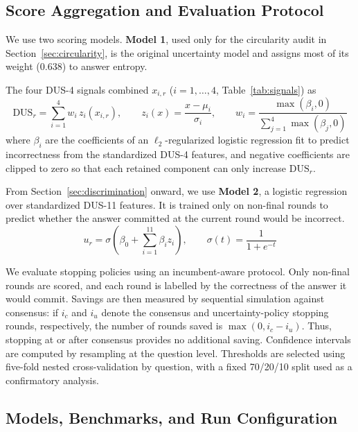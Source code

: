 \documentclass{llncs}
\begin{document}
\subsection{Score Aggregation and Evaluation Protocol}
\label{sec:protocols}

We use two scoring models. \textbf{Model 1}, used only for the circularity audit in Section~\ref{sec:circularity}, is the original uncertainty model and assigns most of its weight (0.638) to answer entropy. 

The four DUS-4 signals combined $x_{i,r}$ ($i=1,\dots,4$, Table~\ref{tab:signals}) as
\begin{equation}
\mathrm{DUS}_r = \sum_{i=1}^{4} w_i\, z_i(x_{i,r}), \qquad
z_i(x) = \frac{x-\mu_i}{\sigma_i}, \qquad
w_i = \frac{\max(\beta_i,0)}{\sum_{j=1}^{4}\max(\beta_j,0)}
\label{eq:dus4}
\end{equation}
where $\beta_i$ are the coefficients of an $\ell_2$-regularized logistic regression fit to predict incorrectness from the standardized DUS-4 features, and negative coefficients are clipped to zero so that each retained component can only increase $\mathrm{DUS}_r$.

From Section~\ref{sec:discrimination} onward, we use \textbf{Model 2}, a logistic regression over standardized DUS-11 features. It is trained only on non-final rounds to predict whether the answer committed at the current round would be incorrect.
\begin{equation}
u_r = \sigma\!\left(\beta_0+\sum_{i=1}^{11}\beta_i z_i\right),
\qquad \sigma(t)=\frac{1}{1+e^{-t}}
\label{eq:dus11}
\end{equation}

We evaluate stopping policies using an incumbent-aware protocol. Only non-final rounds are scored, and each round is labelled by the correctness of the answer it would commit. Savings are then measured by sequential simulation against consensus: if $i_c$ and $i_u$ denote the consensus and uncertainty-policy stopping rounds, respectively, the number of rounds saved is $\max(0,i_c-i_u)$. Thus, stopping at or after consensus provides no additional saving. Confidence intervals are computed by resampling at the question level. Thresholds are selected using five-fold nested cross-validation by question, with a fixed 70/20/10 split used as a confirmatory analysis.

\subsection{Models, Benchmarks, and Run Configuration}
\end{document}

